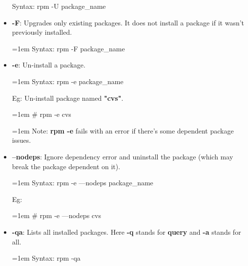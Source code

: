 \begin{flushleft}
\begin{itemize}
\begin{tcolorbox}[breakable,notitle,boxrule=-0pt,colback=pink,colframe=pink]
			Syntax: rpm -U package\_name
			\font=4pt
		\end{tcolorbox}
		\bigskip
		\bigskip
		\newpage
		\item \textbf{-F}: Upgrades only existing packages. It does not install a package if it wasn't previously installed.
		\begin{tcolorbox}[breakable,notitle,boxrule=-0pt,colback=pink,colframe=pink]
			\color{black}
			\font=1em
			Syntax: rpm -F package\_name
			\font=4pt
		\end{tcolorbox}
		\bigskip
		\bigskip
		\item \textbf{-e}: Un-install a package.
		\begin{tcolorbox}[breakable,notitle,boxrule=-0pt,colback=pink,colframe=pink]
			\color{black}
			\font=1em
			Syntax: rpm -e package\_name
			\font=4pt
		\end{tcolorbox}
		Eg: Un-install package named \textbf{"cvs"}.
		\bigskip
		\begin{tcolorbox}[breakable,notitle,boxrule=-0pt,colback=black,colframe=black]
			\color{white}
			\font=1em
			\color{green}
			\# rpm -e cvs
			\font=4pt
		\end{tcolorbox}
		\bigskip
		\begin{tcolorbox}[breakable,notitle,boxrule=-0pt,colback=yellow,colframe=yellow]
			\color{black}
			\font=1em
			Note: \textbf{rpm -e} fails with an error if there's some dependent package issues.
			\font=4pt
		\end{tcolorbox}
	
		\bigskip
		\bigskip
		\item \textbf{--nodeps}: Ignore dependency error and uninstall the package (which may break the package dependent on it).
		\bigskip
		\begin{tcolorbox}[breakable,notitle,boxrule=-0pt,colback=pink,colframe=pink]
			\color{black}
			\font=1em
			Syntax: rpm -e ---nodeps package\_name
			\font=4pt
		\end{tcolorbox}
		
		Eg: 
		\bigskip
		\begin{tcolorbox}[breakable,notitle,boxrule=-0pt,colback=black,colframe=black]
			\color{white}
			\font=1em
			\color{green}
			\# rpm -e ---nodeps cvs
			\font=4pt
		\end{tcolorbox}
		
		\bigskip
		\bigskip
		\item \textbf{-qa}: Lists all installed packages. Here \textbf{-q} stands for \textbf{query} and \textbf{-a} stands for all.
		\bigskip
		\begin{tcolorbox}[breakable,notitle,boxrule=-0pt,colback=pink,colframe=pink]
			\color{black}
			\font=1em
			Syntax: rpm -qa
			\font=4pt
		\end{tcolorbox}
		

\end{itemize}
\end{flushleft}
